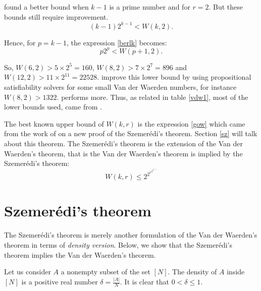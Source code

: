 \cite{brk1968} found a better bound when $k-1$ is a prime number  and for $r=2$. But these bounds still  require improvement. 
 \begin{equation}
 (k-1)2^{k-1}<W(k,2). \label{berlk}
 \end{equation}

Hence, for $p=k-1$, the expression \eqref{berlk} becomes:
 \begin{equation}
 p2^{p}<W(p+1,2). \label{berlk1}
\end{equation}

So, $W(6,2) >5 \times 2^5=160$, $W(8,2) >7 \times 2^7= 896$ and $W(12,2) >11 \times 2^11= 22528.$
\citep{dransfield2004} improve this lower bound by using propositional satisfiability solvers  for some small Van der Waerden numbers, for instance $W( 8,2) > 1322$. \cite{rabung2012} performs more. Thus, as related in table \eqref{vdw1}, most of the lower bounds used, came from \cite{rabung2012}.

The best known upper bound of $W(k,r)$ is the expression  \eqref{gow} which came from the work of \cite{gowers2001new} on a  new proof of the Szemerédi's theorem. Section \eqref{sz} will talk about this theorem. The  Szemerédi's theorem is the extension of the Van der Waerden's theorem, that is the Van der Waerden's theorem is implied by the  Szemerédi's theorem:
\begin{equation}
W(k,r) \leq 2^{2^{r^{2^{2^{k+9}}}}}     \label{gow}
\end{equation}




\section{Szemerédi's theorem} \label{sz}

The Szemerédi's theorem is merely another formulation of  the Van der Waerden's theorem in terms of \textit{density version}. Below, we show that the Szemerédi's theorem implies the Van der Waerden's theorem.

Let us consider $A$ a nonempty subset of the set $[N]$. The density of $A$ inside $[N]$ is a positive real number $\delta=\frac{|A|}{N}$. It is clear that $0< \delta \leq 1.$ 

